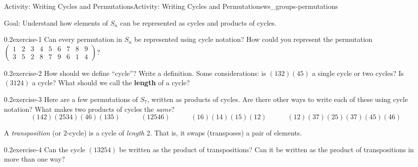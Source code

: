 \documentclass[oneside,11pt,]{article}
\title{}
\date{}
\newcommand{\terminology}[1]{\textbf{#1}}
\newcommand{\amp}{&}
\begin{document}
%
%
\typeout{************************************************}
\typeout{************************************************}
%
\begin{worksheet-section-numberless}{Activity: Writing Cycles and Permutations}{}{Activity: Writing Cycles and Permutations}{}{}{ws_groups-permutations}
\begin{introduction}{}%
\hypertarget{p-1}{}%
Goal: Understand how elements of \(S_n\) can be represented as cycles and products of cycles.%
\end{introduction}%
\begin{divisionexercise}{1}{}{0.2}{exercise-1}%
\hypertarget{p-2}{}%
Can every permutation in \(S_n\) be represented using cycle notation?  How could you represent the permutation \(\begin{pmatrix}1 \amp 2 \amp 3 \amp 4 \amp 5 \amp 6 \amp 7 \amp 8 \amp 9 \\ 3 \amp 5 \amp 2 \amp 8 \amp 7 \amp 9 \amp 6 \amp 1 \amp 4  \end{pmatrix}\)?%
\end{divisionexercise}%
\begin{divisionexercise}{2}{}{0.2}{exercise-2}%
\hypertarget{p-4}{}%
How should we define ``cycle''?  Write a definition.  Some considerations: is \((132)(45)\) a single cycle or two cycles?  Is \((3124)\) a cycle?  What should we call the \terminology{length} of a cycle?%
\end{divisionexercise}%
\begin{divisionexercise}{3}{}{0.2}{exercise-3}%
\hypertarget{p-6}{}%
Here are a few permutations of \(S_7\), written as products of cycles.  Are there other ways to write each of these using cycle notation?  What makes two products of cycles the \emph{same}?%
\begin{equation*}
(142)(2534)(46)(135) \qquad\quad (12546) \qquad\quad (16)(14)(15)(12) \qquad\quad (12)(37)(25)(37)(45)(46)
\end{equation*}
%
\end{divisionexercise}%
\clearpage
\hypertarget{p-8}{}%
A \emph{transposition} (or \(2\)-cycle) is a cycle of \emph{length} 2.  That is, it swaps (transposes) a pair of elements.%
\begin{divisionexercise}{4}{}{0.2}{exercise-4}%
\hypertarget{p-9}{}%
Can the cycle \((13254)\) be written as the product of transpositions?  Can it be written as the product of transpositions in more than one way?%

\end{divisionexercise}
\end{worksheet-section-numberless}
\end{document}
